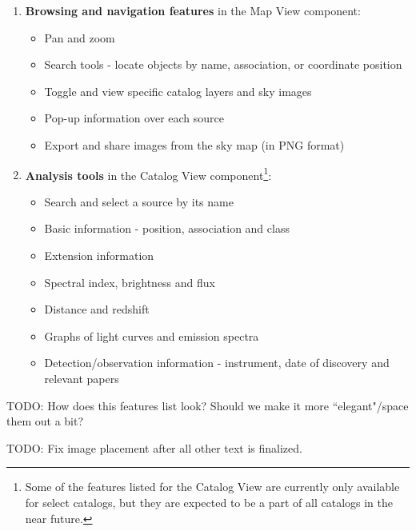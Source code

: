   \begin{enumerate}

    \item \textbf{Browsing and navigation features} in the Map View component:

      \begin{itemize}

        \item Pan and zoom
        \item Search tools - locate objects by name, association, or coordinate position
        \item Toggle and view specific catalog layers and sky images
        \item Pop-up information over each source
        \item Export and share images from the sky map (in PNG format)

      \end{itemize}

    \item \textbf{Analysis tools} in the Catalog View component\footnote[1]{Some of the features listed for the Catalog View are currently only available for select catalogs, but they are expected to be a part of all catalogs in the near future.}:

      \begin{itemize}

        \item Search and select a source by its name
        \item Basic information - position, association and class
        \item Extension information
        \item Spectral index, brightness and flux
        \item Distance and redshift
        \item Graphs of light curves and emission spectra
        \item Detection/observation information - instrument, date of discovery and relevant papers

      \end{itemize}

  \end{enumerate}


  TODO: How does this features list look? Should we make it more ``elegant"/space them out a bit?


  TODO: Fix image placement after all other text is finalized.


